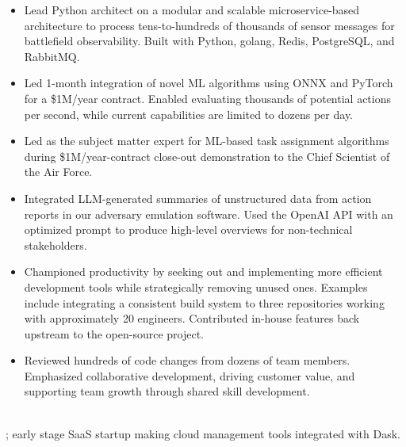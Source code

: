 \begin{itemize}
\item Lead Python architect on a modular and scalable microservice-based architecture to process tens-to-hundreds of thousands of sensor messages for battlefield observability. Built with Python, golang, Redis, PostgreSQL, and RabbitMQ.
\item Led 1-month integration of novel ML algorithms using ONNX and PyTorch for a \$1M/year contract. Enabled evaluating thousands of potential actions per second, while current capabilities are limited to dozens per day.
\item Led as the subject matter expert for ML-based task assignment algorithms during \$1M/year-contract close-out demonstration to the Chief Scientist of the Air Force.
\item Integrated LLM-generated summaries of unstructured data from action reports in our adversary emulation software. Used the OpenAI API with an optimized prompt to produce high-level overviews for non-technical stakeholders.
\item Championed productivity by seeking out and implementing more efficient development tools while strategically removing unused ones. Examples include integrating a consistent build system to three repositories working with approximately 20 engineers. Contributed in-house features back upstream to the open-source project.
\item Reviewed hundreds of code changes from dozens of team members. Emphasized collaborative development, driving customer value, and supporting team growth through shared skill development.
\end{itemize}
\sectionsep

\\
; early stage SaaS startup making cloud management tools integrated with Dask.

